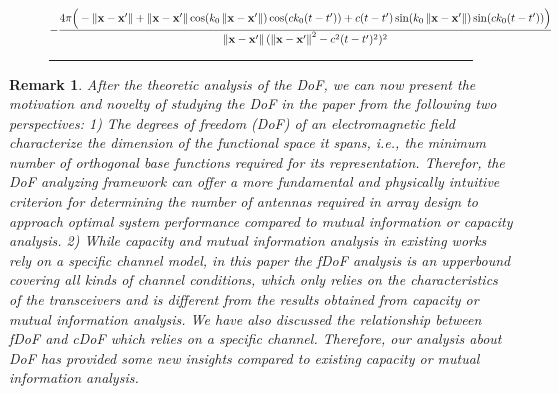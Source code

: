 \documentclass[12pt,draftclsnofoot,journal,onecolumn]{IEEEtran}
\newtheorem{remark}{Remark}
\begin{document}
			\begin{figure}
		\begin{equation}
			\begin{aligned}
				-\frac{4\pi\Big(- \left\| {\bf x}-{\bf x}' \right\| + \left\| {\bf x}-{\bf x}' \right\| \cos(k_0\left\| {\bf x}-{\bf x}' \right\|)\cos(ck_0(t-t')) + c(t-t')\sin(k_0\left\| {\bf x}-{\bf x}' \right\|)\sin(ck_0(t-t'))  \Big)}{\left\| {\bf x}-{\bf x}' \right\|(\left\| {\bf x}-{\bf x}' \right\|^2-c^2(t-t')^2)^2}
			\end{aligned}
			\label{equ_kernel_expression}
		\end{equation}
		{\noindent} \rule[-10pt]{18cm}{0.05em}
	\end{figure}
	

	{\color{red}
	\begin{remark}
		After the theoretic analysis of the DoF, we can now present the motivation and novelty of studying the DoF in the paper from the following two perspectives: 1) The degrees of freedom (DoF) of an electromagnetic field characterize the dimension of the functional space it spans, i.e., the minimum number of orthogonal base functions required for its representation. Therefor, the DoF analyzing framework can offer a more fundamental and physically intuitive criterion for determining the number of antennas required in array design to approach optimal system performance compared to mutual information or capacity analysis. 2) While capacity and mutual information analysis in existing works rely on a specific channel model, in this paper the fDoF analysis is an upperbound covering all kinds of channel conditions, which only relies on the characteristics of the transceivers and is different from the results obtained from capacity or mutual information analysis. We have also discussed the relationship between fDoF and cDoF which relies on a specific channel. Therefore, our analysis about DoF has provided some new insights compared to existing capacity or mutual information analysis. 
	\end{remark}
	}
	
\end{document}
